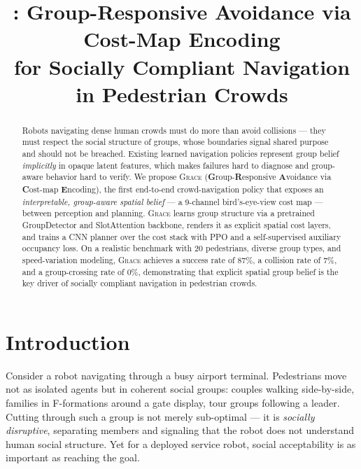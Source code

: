 \documentclass{article}
\title{\grace{}: Group-Responsive Avoidance via Cost-Map Encoding\\
       for Socially Compliant Navigation in Pedestrian Crowds}
\newcommand{\grace}{\textsc{Grace}}
\begin{document}
\maketitle

\begin{abstract}
Robots navigating dense human crowds must do more than avoid collisions — they
must respect the social structure of groups, whose boundaries signal shared
purpose and should not be breached.
Existing learned navigation policies represent group belief \emph{implicitly}
in opaque latent features, which makes failures hard to diagnose and
group-aware behavior hard to verify.
We propose \grace{} (\textbf{G}roup-\textbf{R}esponsive \textbf{A}voidance via
\textbf{C}ost-map \textbf{E}ncoding), the first end-to-end crowd-navigation
policy that exposes an \emph{interpretable, group-aware spatial belief} — a
9-channel bird's-eye-view cost map — between perception and planning.
\grace{} learns group structure via a pretrained GroupDetector and SlotAttention
backbone, renders it as explicit spatial cost layers, and trains a CNN planner
over the cost stack with PPO and a self-supervised auxiliary occupancy loss.
On a realistic benchmark with 20 pedestrians, diverse group types, and
speed-variation modeling, \grace{} achieves a success rate of 87\%, a collision
rate of 7\%, and a group-crossing rate of 0\%, demonstrating that explicit
spatial group belief is the key driver of socially compliant navigation in pedestrian crowds.
\end{abstract}


\section{Introduction}
\label{sec:intro}

Consider a robot navigating through a busy airport terminal. Pedestrians move
not as isolated agents but in coherent social groups: couples walking
side-by-side, families in F-formations around a gate display, tour groups
following a leader. Cutting through such a group is not merely sub-optimal —
it is \emph{socially disruptive}, separating members and signaling that the
robot does not understand human social structure. Yet for a deployed service
robot, social acceptability is as important as reaching the goal.
\end{document}
